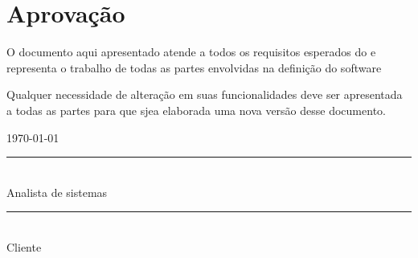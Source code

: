 \section{Aprovação}

\begin{flushleft}

  O documento aqui apresentado atende a todos os requisitos esperados do \myTitle
  e representa o trabalho de todas as partes envolvidas na definição do software

  Qualquer necessidade de alteração em suas funcionalidades deve ser apresentada
  a todas as partes para que sjea elaborada uma nova versão desse documento.


\end{flushleft}


\hspace{7.0cm}




\begin{flushright}
  \today
\end{flushright}

\hspace{7.0cm} 


\begin{center}
  \rule{6cm}{0.02cm}\\
  Analista de sistemas  
\end{center}

\hspace{5.0cm}


\begin{center}
  \rule{6cm}{0.02cm}\\
  Cliente
\end{center}